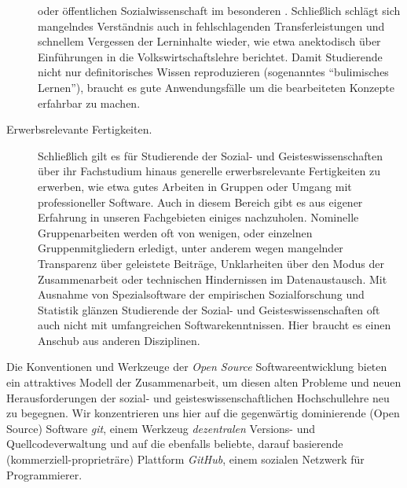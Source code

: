 \documentclass[11pt,a4paper,oneside]{article}
\begin{document}
\begin{description}
		oder öffentlichen Sozialwissenschaft im besonderen \cite{gans1989public-sociology}.
		Schließlich schlägt sich mangelndes Verständnis auch in fehlschlagenden Transferleistungen und schnellem Vergessen der Lerninhalte wieder, wie etwa \cite{Frank2007a} anektodisch über Einführungen in die Volkswirtschaftslehre berichtet.
		Damit Studierende nicht nur definitorisches Wissen reproduzieren (sogenanntes ``bulimisches Lernen''), braucht es gute Anwendungsfälle um die bearbeiteten Konzepte erfahrbar zu machen.
	\item[Erwerbsrelevante Fertigkeiten.]
		Schließlich gilt es für Studierende der Sozial- und Geisteswissenschaften über ihr Fachstudium hinaus generelle erwerbsrelevante Fertigkeiten zu erwerben, wie etwa gutes Arbeiten in Gruppen oder Umgang mit professioneller Software.
		Auch in diesem Bereich gibt es aus eigener Erfahrung in unseren Fachgebieten einiges nachzuholen.
		Nominelle Gruppenarbeiten werden oft von wenigen, oder einzelnen Gruppenmitgliedern erledigt, unter anderem wegen mangelnder Transparenz über geleistete Beiträge, Unklarheiten über den Modus der Zusammenarbeit oder technischen Hindernissen im Datenaustausch.
		Mit Ausnahme von Spezialsoftware der empirischen Sozialforschung und Statistik glänzen Studierende der Sozial- und Geisteswissenschaften oft auch nicht mit umfangreichen Softwarekenntnissen.
		Hier braucht es einen Anschub aus anderen Disziplinen.
\end{description}

Die Konventionen und Werkzeuge der \emph{Open Source} Softwareentwicklung bieten ein attraktives Modell der Zusammenarbeit, um diesen alten Probleme und neuen Herausforderungen der sozial- und geisteswissenschaftlichen Hochschullehre neu zu begegnen.
Wir konzentrieren uns hier auf die gegenwärtig dominierende  (Open Source) Software \emph{git}, einem Werkzeug \emph{dezentralen} Versions- und Quellcodeverwaltung und auf die ebenfalls beliebte, darauf basierende (kommerziell-proprieträre) Plattform \emph{GitHub}, einem sozialen Netzwerk für Programmierer.
\end{document}
